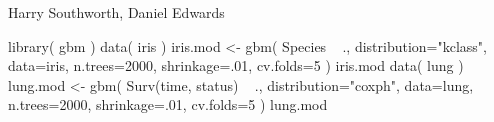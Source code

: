 \begin{Author}\relax
Harry Southworth, Daniel Edwards
\end{Author}
\begin{SeeAlso}\relax
{}
\end{SeeAlso}
\begin{Examples}
\begin{ExampleCode}
library( gbm )
data( iris )
iris.mod <- gbm( Species ~ ., distribution="kclass", data=iris,
                 n.trees=2000, shrinkage=.01, cv.folds=5 )
iris.mod
data( lung )
lung.mod <- gbm( Surv(time, status) ~ ., distribution="coxph", data=lung,
                 n.trees=2000, shrinkage=.01, cv.folds=5 )
lung.mod
\end{ExampleCode}
\end{Examples}

